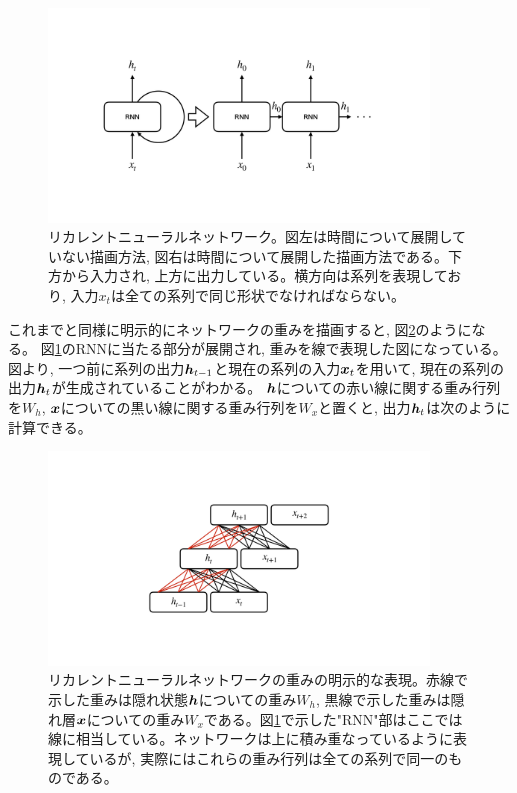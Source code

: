 \begin{figure}[htbp]
 \centering
 \includegraphics[trim = 0 200 0 200, width=0.9\textwidth, clip]{Figure/2DeepLearning/7RecurrentNeuralNetwork.png}
 \caption[リカレントニューラルネットワーク]{リカレントニューラルネットワーク。図左は時間について展開していない描画方法, 図右は時間について展開した描画方法である。下方から入力され, 上方に出力している。横方向は系列を表現しており, 入力$x_t$は全ての系列で同じ形状でなければならない。}
 \label{7RecurrentNeuralNetwork}
\end{figure}

これまでと同様に明示的にネットワークの重みを描画すると, 図\ref{8RNNWeight}のようになる。
図\ref{7RecurrentNeuralNetwork}のRNNに当たる部分が展開され, 重みを線で表現した図になっている。
図より, 一つ前に系列の出力${\mbox{\boldmath{$h$}}}_{t-1}$と現在の系列の入力${\mbox{\boldmath{$x$}}}_t$を用いて, 現在の系列の出力${\mbox{\boldmath{$h$}}}_t$が生成されていることがわかる。
${\mbox{\boldmath{$h$}}}$についての赤い線に関する重み行列を$W_h$, ${\mbox{\boldmath{$x$}}}$についての黒い線に関する重み行列を$W_x$と置くと, 出力${\mbox{\boldmath{$h$}}}_t$は次のように計算できる。

\begin{figure}[htbp]
 \centering
 \includegraphics[trim = 0 200 0 200, width=0.9\textwidth, clip]{Figure/2DeepLearning/8RNNWeight.png}
 \caption[リカレントニューラルネットワークの重みの明示的な表現]{リカレントニューラルネットワークの重みの明示的な表現。赤線で示した重みは隠れ状態${\mbox{\boldmath{$h$}}}$についての重み$W_h$, 黒線で示した重みは隠れ層${\mbox{\boldmath{$x$}}}$についての重み$W_x$である。図\ref{7RecurrentNeuralNetwork}で示した"RNN"部はここでは線に相当している。ネットワークは上に積み重なっているように表現しているが, 実際にはこれらの重み行列は全ての系列で同一のものである。}
 \label{8RNNWeight}
\end{figure}

